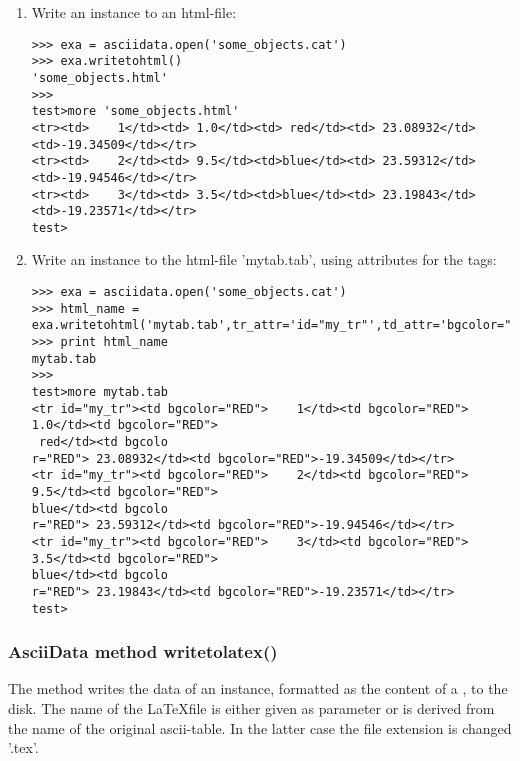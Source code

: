 \begin{enumerate}
\item Write an \ad instance to an html-file:
\begin{small}
\begin{verbatim}
>>> exa = asciidata.open('some_objects.cat')
>>> exa.writetohtml()
'some_objects.html'
>>>
test>more 'some_objects.html'
<tr><td>    1</td><td> 1.0</td><td> red</td><td> 23.08932</td><td>-19.34509</td></tr>
<tr><td>    2</td><td> 9.5</td><td>blue</td><td> 23.59312</td><td>-19.94546</td></tr>
<tr><td>    3</td><td> 3.5</td><td>blue</td><td> 23.19843</td><td>-19.23571</td></tr>
test>
\end{verbatim}
\end{small}
\item Write an \ad instance to the html-file 'mytab.tab', using attributes
for the tags:
\begin{small}
\begin{verbatim}
>>> exa = asciidata.open('some_objects.cat')
>>> html_name = exa.writetohtml('mytab.tab',tr_attr='id="my_tr"',td_attr='bgcolor="RED"')
>>> print html_name
mytab.tab
>>>
test>more mytab.tab
<tr id="my_tr"><td bgcolor="RED">    1</td><td bgcolor="RED"> 1.0</td><td bgcolor="RED">
 red</td><td bgcolo
r="RED"> 23.08932</td><td bgcolor="RED">-19.34509</td></tr>
<tr id="my_tr"><td bgcolor="RED">    2</td><td bgcolor="RED"> 9.5</td><td bgcolor="RED">
blue</td><td bgcolo
r="RED"> 23.59312</td><td bgcolor="RED">-19.94546</td></tr>
<tr id="my_tr"><td bgcolor="RED">    3</td><td bgcolor="RED"> 3.5</td><td bgcolor="RED">
blue</td><td bgcolo
r="RED"> 23.19843</td><td bgcolor="RED">-19.23571</td></tr>
test>
\end{verbatim}
\end{small}
\end{enumerate}


\subsubsection{AsciiData method writetolatex()}
\label{adm_writetolatex}
%
The method writes the data of an \ad instance, formatted as the content of
a ,
to the disk. The name of the \LaTeX file is either given as parameter or is
derived from the name of the original ascii-table.
In the latter case the file extension is changed '.tex'.

